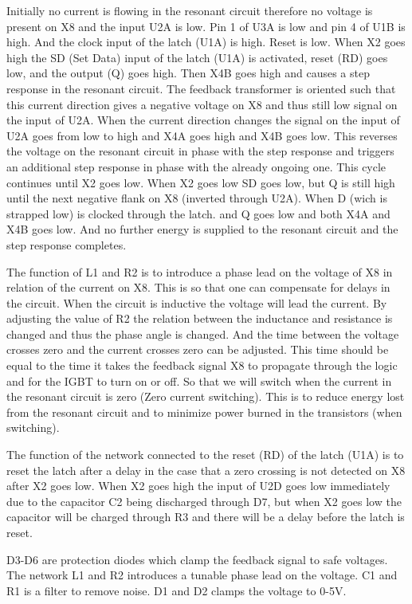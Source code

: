 Initially no current is flowing in the resonant circuit therefore no voltage is present on X8 and the input U2A is low. Pin 1 of U3A is low and pin 4 of U1B is high. And the clock input of the latch (U1A) is high. Reset is low. When X2 goes high the SD (Set Data) input of the latch (U1A) is activated, reset (RD) goes low, and the output (Q) goes high. Then X4B goes high and causes a step response in the resonant circuit. The feedback transformer is oriented such that this current direction gives a negative voltage on X8 and thus still low signal on the input of U2A. When the current direction changes the signal on the input of U2A goes from low to high and X4A goes high and X4B goes low. This reverses the voltage on the resonant circuit in phase with the step response and triggers an additional step response in phase with the already ongoing one. This cycle continues until X2 goes low. When X2 goes low SD goes low, but Q is still high until the next negative flank on X8 (inverted through U2A). When D (wich is strapped low) is clocked through the latch. and Q goes low and both X4A and X4B goes low. And no further energy is supplied to the resonant circuit and the step response completes.

The function of L1 and R2 is to introduce a phase lead on the voltage of X8 in relation of the current on X8. This is so that one can compensate for delays in the circuit. When the circuit is inductive the voltage will lead the current. By adjusting the value of R2 the relation between the inductance and resistance is changed and thus the phase angle is changed. And the time between the voltage crosses zero and the current crosses zero can be adjusted. This time should be equal to the time it takes the feedback signal X8 to propagate through the logic and for the IGBT to turn on or off. So that we will switch when the current in the resonant circuit is zero (Zero current switching). This is to reduce energy lost from the resonant circuit and to minimize power burned in the transistors (when switching).

The function of the network connected to the reset (RD) of the latch (U1A) is to reset the latch after a delay in the case that a zero crossing is not detected on X8 after X2 goes low. When X2 goes high the input of U2D goes low immediately due to the capacitor C2 being discharged through D7, but when X2 goes low the capacitor will be charged through R3 and there will be a delay before the latch is reset.

D3-D6 are protection diodes which clamp the feedback signal to safe voltages. The network L1 and R2 introduces a tunable phase lead on the voltage. C1 and R1 is a filter to remove noise. D1 and D2 clamps the voltage to 0-5V.


